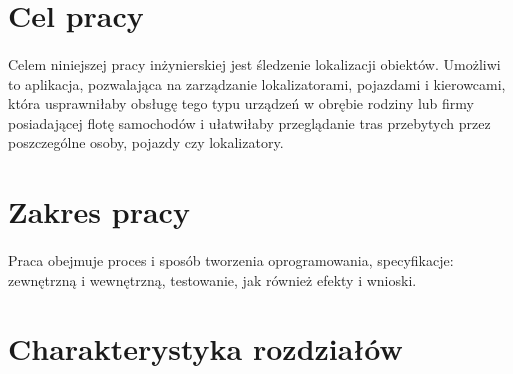 \section{Cel pracy}
\paragraph{}
Celem niniejszej pracy inżynierskiej jest śledzenie lokalizacji obiektów. Umożliwi to aplikacja, pozwalająca na zarządzanie lokalizatorami, pojazdami i kierowcami, która usprawniłaby obsługę tego typu urządzeń w obrębie rodziny lub firmy posiadającej flotę samochodów i ułatwiłaby przeglądanie tras przebytych przez poszczególne osoby, pojazdy czy lokalizatory.

\section{Zakres pracy}
\paragraph{}
 Praca obejmuje proces i sposób tworzenia oprogramowania, specyfikacje: zewnętrzną i wewnętrzną, testowanie, jak również efekty i wnioski.

\section{Charakterystyka rozdziałów}
